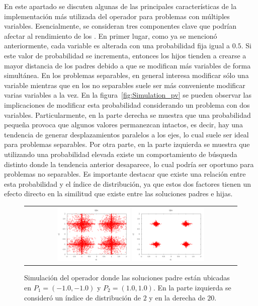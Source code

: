 En este apartado se discuten algunas de las principales características de la implementación más utilizada del operador \SBX{} para problemas con
múltiples variables.
%
Esencialmente, se consideran tres componentes clave que podrían afectar al rendimiento de los \MOEAS{}.
%
En primer lugar, como ya se mencionó anteriormente, cada variable es alterada con una probabilidad fija igual a $0.5$.
%
Si este valor de probabilidad se incrementa, entonces los hijos tienden a crearse a mayor distancia de los padres debido a que se 
modifican más variables de forma simultánea.
%
En los problemas separables, en general interesa modificar sólo una variable mientras que en los no separables suele ser más conveniente
modificar varias variables a la vez.
%
En la figura~\ref{fig:Simulation_pv} se pueden observar las implicaciones de modificar esta probabilidad considerando un problema con dos variables.
%
Particularmente, en la parte derecha se muestra que una probabilidad pequeña provoca que algunos valores permanezcan intactos, es decir,
hay una tendencia de generar desplazamientos paralelos a los ejes, lo cual suele ser ideal para problemas separables.
%
Por otra parte, en la parte izquierda se muestra que utilizando una probabilidad elevada existe un comportamiento de búsqueda distinto donde la tendencia anterior desaparece, 
lo cual podría ser oportuno para problemas no separables.
%
Es importante destacar que existe una relación entre esta probabilidad y el índice de distribución, ya que estos dos factores tienen un efecto directo en la similitud 
que existe entre las soluciones padres e hijas.
%
\begin{figure}[t]
\centering
\begin{tabular}{c}
   \includegraphics[width=0.35\textwidth]{img/Operadores/SBX_eta_2.png}  %
   \includegraphics[width=0.35\textwidth]{img/Operadores/SBX_eta_20.png} 
\end{tabular}
\caption{Simulación del operador \SBX{} donde las soluciones padre están ubicadas en $P_1=(-1.0, -1.0)$ y $P_2=(1.0, 1.0)$. En la parte izquierda se consideró un índice de distribución de $2$ y en la derecha de $20$.}
\label{fig:Simulation_Case_3}
\end{figure}

